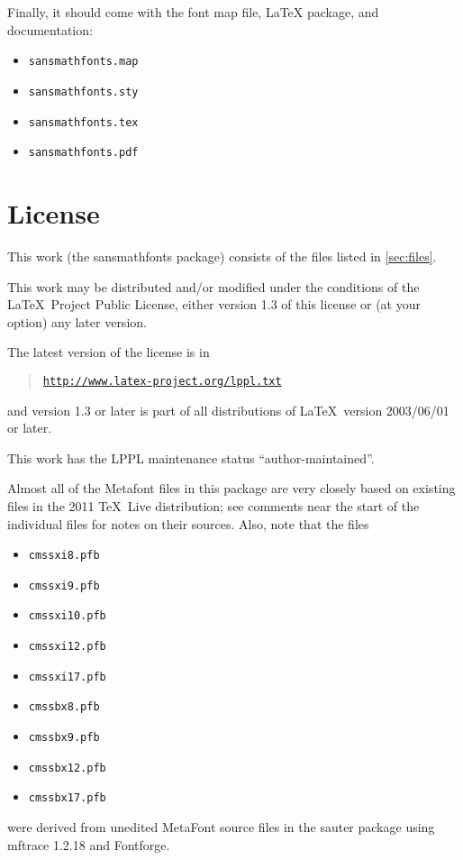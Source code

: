 \documentclass{amsart}
\begin{document}
Finally, it should come with the font map file, LaTeX package, and documentation:

\begin{itemize}
\item \texttt{sansmathfonts.map}
\item \texttt{sansmathfonts.sty}
\item \texttt{sansmathfonts.tex}
\item \texttt{sansmathfonts.pdf}
\end{itemize}





\section{License}

This work (the \textsf{sansmathfonts} package) consists of the
files listed in \autoref{sec:files}.

This work may be distributed and/or modified under the
conditions of the \LaTeX\ Project Public License, either
version 1.3 of this license or (at your option) any
later version.

The latest version of the license is in
\begin{quote}
\href {http://www.latex-project.org/lppl.txt} 
{\texttt{http://www.latex-project.org/lppl.txt}}
\end{quote}
and version 1.3 or later is part of all distributions of
\LaTeX\ version 2003/06/01 or later.

This work has the LPPL maintenance status ``author-maintained''.

Almost all of the Metafont files in this package are very closely based on existing files in the 2011 \TeX\ Live distribution; see comments near the start of the individual files for notes on their sources. Also, note that the 
files
\begin{itemize}
\item \texttt{cmssxi8.pfb}
\item \texttt{cmssxi9.pfb}
\item \texttt{cmssxi10.pfb}
\item \texttt{cmssxi12.pfb}
\item \texttt{cmssxi17.pfb}
\item \texttt{cmssbx8.pfb}
\item \texttt{cmssbx9.pfb}
\item \texttt{cmssbx12.pfb}
\item \texttt{cmssbx17.pfb}
\end{itemize}
were derived from unedited MetaFont source files in the \textsf{sauter} package using mftrace 1.2.18 and Fontforge. 
\end{document}
